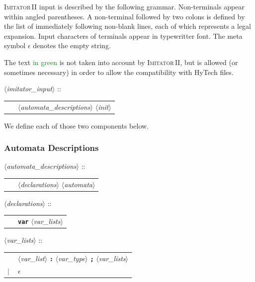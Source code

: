 \documentclass[a4paper,10pt]{article}
\newcommand{\emptystring}{$\epsilon$}
\newcommand{\hytech}{{\sc HyTech}}
\newcommand{\imitatordeux}{\textsc{Imitator}\,II}
\newcommand{\nt}[1]{$\langle$\emph{#1}$\rangle$}
\newcommand{\regleGrammaire}[1]{\bigskip \noindent \nt{#1} :: \\}
\newcommand{\npec}[1]{\textcolor{green}{#1}}
\newcommand{\code}[1]{\textbf{\texttt{#1}}}
\begin{document}
\imitatordeux{} input is described by the following grammar.
Non-terminals appear within angled parentheses.
A non-terminal followed by two colons is defined by the list of immediately following non-blank lines, each of which represents a legal expansion.
Input characters of terminals appear in typewritter font.
The meta symbol \emptystring{} denotes the empty string.

The text \npec{in green} is not taken into account by \imitatordeux{}, but is allowed (or sometimes necessary) in order to allow the compatibility with \hytech{} files.


\regleGrammaire{imitator\_input}
\begin{tabular}{l l}
	\  & \nt{automata\_descriptions} \nt{init} \\
\end{tabular}

\medskip


We define each of those two components below.

\subsubsection{Automata Descriptions}

\regleGrammaire{automata\_descriptions}
\begin{tabular}{l l}
	\  & \nt{declarations} \nt{automata} \\
\end{tabular}

\regleGrammaire{declarations}
\begin{tabular}{l l}
	\  & \code{var} \nt{var\_lists} \\
\end{tabular}

\regleGrammaire{var\_lists}
\begin{tabular}{l l}
	\  & \nt{var\_list} \code{:} \nt{var\_type} \code{;} \nt{var\_lists} \\
	$|$ & \emptystring
\end{tabular}
\end{document}
